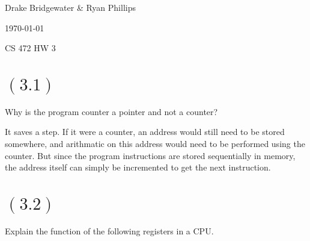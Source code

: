 \documentclass[letterpaper,12pt,titlepage]{article}
\def\name{Drake Bridgewater \& Ryan Phillips}
\begin{document}
\hfill \name

\hfill \today

\hfill CS 472 HW 3

\section*{$(3.1)$} Why is the program counter a pointer and not a counter? 

\begin{mdframed}[style=MyFrame]

It saves a step. If it were a counter, an address would still need to be stored somewhere, and arithmatic on this address would need to be performed using the counter. But since the program instructions are stored sequentially in memory, the address itself can simply be incremented to get the next instruction.

\end{mdframed}
  
\section*{$(3.2)$} Explain the function of the following registers in a CPU.
\end{document}
